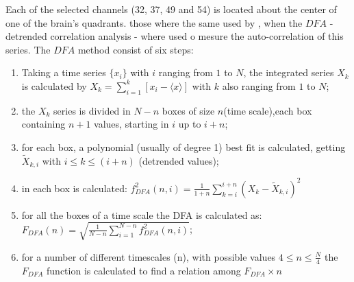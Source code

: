 Each of the selected channels (32, 37, 49 and 54) is located about the center of one of the brain's quadrants. those where the same used by \cite{Zebende2017}, when the \(DFA\) - detrended correlation analysis - where used o mesure the auto-correlation of this series. The \(DFA\) method consist of six steps:


\begin{enumerate}
  \label{dfa}
  \item Taking a time series \(\{x_{i}\}\) with \(i\) ranging from \(1\) to \(N\), the integrated series \(X_{k}\) is calculated by \(X_{k} = \sum_{i=1}^{k}\left[x_{i} - \langle x \rangle \right] \) with \(k\) also ranging from \(1\) to \(N\);
  \item the  \(X_{k}\) series is divided in \(N - n\) boxes of size \(n\)(time scale),each box containing \(n + 1\) values, starting in \(i\) up to \(i + n\);
  \item for each box, a polynomial (usually of degree 1) best fit is calculated, getting \(\widetilde{X}_{k, i}\) with \( i \le k \le (i + n) \) (detrended values);
  \item  in each box is calculated: \(f_{DFA}^{2}(n, i) = \frac{1}{1+n} \sum_{k=i}^{i + n}(X_{k}-\widetilde{X}_{k, i})^{2}\)
  \item for all the boxes of a time scale the DFA is calculated as: \(F_{DFA}(n) = \sqrt{\frac{1}{N - n} \sum_{i=1}^{N-n} f_{DFA}^{2}(n, i)}\);
  \item for a number of different timescales (n), with possible values \( 4 \le n \le \frac{N}{4}\) the \(F_{DFA}\) function is calculated to find a relation among \(F_{DFA} \times n\)
\end{enumerate}